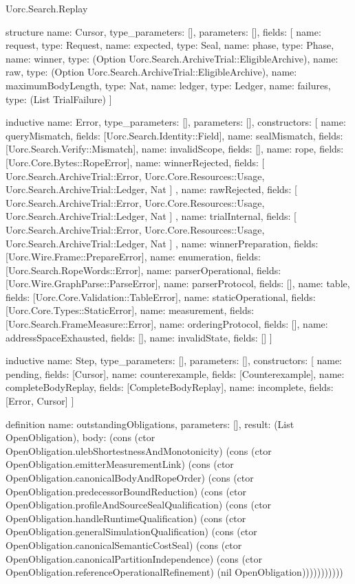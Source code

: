 \begin{lexlean}{Uorc.Search.Replay}
\begin{semanticmodule}
structure{
  name: Cursor,
  type_parameters: [],
  parameters: [],
  fields: [
    {name: request, type: Request},
    {name: expected, type: Seal},
    {name: phase, type: Phase},
    {name: winner, type: (Option Uorc.Search.ArchiveTrial::EligibleArchive)},
    {name: raw, type: (Option Uorc.Search.ArchiveTrial::EligibleArchive)},
    {name: maximumBodyLength, type: Nat},
    {name: ledger, type: Ledger},
    {name: failures, type: (List TrialFailure)}
  ]
}

inductive{
  name: Error,
  type_parameters: [],
  parameters: [],
  constructors: [
    {name: queryMismatch, fields: [Uorc.Search.Identity::Field]},
    {name: sealMismatch, fields: [Uorc.Search.Verify::Mismatch]},
    {name: invalidScope, fields: []},
    {name: rope, fields: [Uorc.Core.Bytes::RopeError]},
    {
      name: winnerRejected,
      fields: [
        Uorc.Search.ArchiveTrial::Error,
        Uorc.Core.Resources::Usage,
        Uorc.Search.ArchiveTrial::Ledger,
        Nat
      ]
    },
    {
      name: rawRejected,
      fields: [
        Uorc.Search.ArchiveTrial::Error,
        Uorc.Core.Resources::Usage,
        Uorc.Search.ArchiveTrial::Ledger,
        Nat
      ]
    },
    {
      name: trialInternal,
      fields: [
        Uorc.Search.ArchiveTrial::Error,
        Uorc.Core.Resources::Usage,
        Uorc.Search.ArchiveTrial::Ledger,
        Nat
      ]
    },
    {name: winnerPreparation, fields: [Uorc.Wire.Frame::PrepareError]},
    {name: enumeration, fields: [Uorc.Search.RopeWords::Error]},
    {name: parserOperational, fields: [Uorc.Wire.GraphParse::ParseError]},
    {name: parserProtocol, fields: []},
    {name: table, fields: [Uorc.Core.Validation::TableError]},
    {name: staticOperational, fields: [Uorc.Core.Types::StaticError]},
    {name: measurement, fields: [Uorc.Search.FrameMeasure::Error]},
    {name: orderingProtocol, fields: []},
    {name: addressSpaceExhausted, fields: []},
    {name: invalidState, fields: []}
  ]
}

inductive{
  name: Step,
  type_parameters: [],
  parameters: [],
  constructors: [
    {name: pending, fields: [Cursor]},
    {name: counterexample, fields: [Counterexample]},
    {name: completeBodyReplay, fields: [CompleteBodyReplay]},
    {name: incomplete, fields: [Error, Cursor]}
  ]
}

definition{
  name: outstandingObligations,
  parameters: [],
  result: (List OpenObligation),
  body: (cons (ctor OpenObligation.ulebShortestnessAndMonotonicity) (cons (ctor OpenObligation.emitterMeasurementLink) (cons (ctor OpenObligation.canonicalBodyAndRopeOrder) (cons (ctor OpenObligation.predecessorBoundReduction) (cons (ctor OpenObligation.profileAndSourceSealQualification) (cons (ctor OpenObligation.handleRuntimeQualification) (cons (ctor OpenObligation.generalSimulationQualification) (cons (ctor OpenObligation.canonicalSemanticCostSeal) (cons (ctor OpenObligation.canonicalPartitionIndependence) (cons (ctor OpenObligation.referenceOperationalRefinement) (nil OpenObligation)))))))))))
}


\end{semanticmodule}
\end{lexlean}
